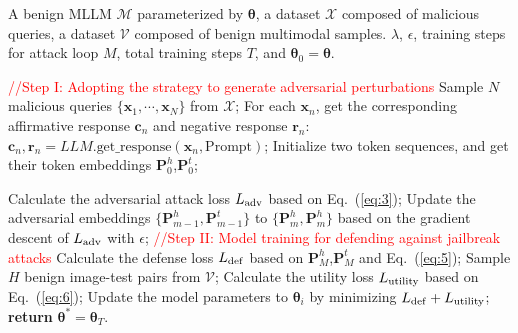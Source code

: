 
\newpage




\renewcommand{\thesection}{\Alph{section}}
\setcounter{section}{0}

\begin{algorithm}[t]
 \small
	\renewcommand{\algorithmicrequire}{\textbf{Input:}}
        
	\renewcommand{\algorithmicensure}{\textbf{Output:}}
	\caption{{\name}}
	\label{alg1}
        \begin{algorithmic}[1]
        \Require A benign MLLM $\mathcal{M}$ parameterized by $\boldsymbol\theta$,  a dataset $\mathcal{X}$ composed of malicious queries, a dataset $\mathcal{V}$ composed of benign multimodal samples.
        \renewcommand{\algorithmicrequire}{\textbf{Parameters:}}
        \Require  $\lambda$, $\epsilon$, training steps for attack loop $M$, total training steps $T$, and $\boldsymbol\theta_0=\boldsymbol\theta$.
        
         \State \textcolor{red}{//Step I: Adopting the {\attack} strategy to generate adversarial perturbations}
        \State Sample $N$ malicious queries $\{\mathbf{x}_1,\cdots, \mathbf{x}_N\}$ from $\mathcal{X}$;
        \State For each $\mathbf{x}_n$, get the corresponding affirmative response $\mathbf{c}_n$ and negative response $\mathbf{r}_n$:
        \State \qquad $\mathbf{c}_n,\mathbf{r}_n=LLM.\text{get\_response}(\mathbf{x}_n,\text{Prompt})$;
        \State Initialize two token sequences, and get their token embeddings $\mathbf{P}_0^{h}$,\;$\mathbf{P}_0^{t}$;
         
            \State Calculate the adversarial attack loss $L_{\rm adv}$ based on Eq.~(\ref{eq:3});
            \State Update the adversarial embeddings $\{\mathbf{P}_{m-1}^{h},\mathbf{P}_{m-1}^{t}\}$ to $\{\mathbf{P}_{m}^{h},\mathbf{P}_{m}^{h}\}$ based on the gradient descent 
            \State of $L_{\rm adv}$ with $\epsilon$;
            \EndFor
            \State \textcolor{red}{//Step II: Model training for defending against jailbreak attacks}
            \State Calculate the defense loss $L_{\rm def}$ based on $\mathbf{P}_{M}^{h}$,\;$\mathbf{P}_{M}^{t}$ and Eq.~(\ref{eq:5});
            \State Sample $H$ benign image-test pairs from $\mathcal{V}$;
            \State Calculate the utility loss $L_{\rm utility}$ based on  Eq.~(\ref{eq:6});
            \State Update the model parameters to $\boldsymbol\theta_{i}$ by minimizing $L_{\rm def} + L_{\rm utility}$;
        \EndFor
        \State \textbf{return} $\boldsymbol\theta^{*}=\boldsymbol\theta_{T}$.
\end{algorithmic}
\label{alg:1}
\end{algorithm}

